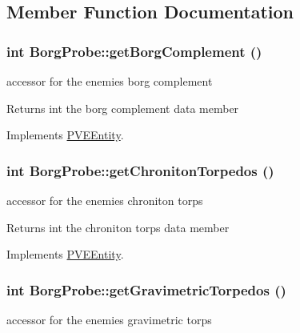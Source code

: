 \subsection{Member Function Documentation}
\hypertarget{classBorgProbe_a4a9d5108f208dcaa28b3f182436fd6e1}{
\subsubsection[{getBorgComplement}]{\setlength{\rightskip}{0pt plus 5cm}int BorgProbe::getBorgComplement ()}}
\label{db/deb/classBorgProbe_a4a9d5108f208dcaa28b3f182436fd6e1}
accessor for the enemies borg complement

\begin{DoxyReturn}{Returns}
int the borg complement data member 
\end{DoxyReturn}


Implements \hyperlink{classPVEEntity}{PVEEntity}.

\hypertarget{classBorgProbe_a4eec0f21a2a68a57498aef50d4d7c544}{
\subsubsection[{getChronitonTorpedos}]{\setlength{\rightskip}{0pt plus 5cm}int BorgProbe::getChronitonTorpedos ()}}
\label{db/deb/classBorgProbe_a4eec0f21a2a68a57498aef50d4d7c544}
accessor for the enemies chroniton torps

\begin{DoxyReturn}{Returns}
int the chroniton torps data member 
\end{DoxyReturn}


Implements \hyperlink{classPVEEntity}{PVEEntity}.

\hypertarget{classBorgProbe_aba5ca1bcf4d4f3f37d80b46bb6b40492}{
\subsubsection[{getGravimetricTorpedos}]{\setlength{\rightskip}{0pt plus 5cm}int BorgProbe::getGravimetricTorpedos ()}}
\label{db/deb/classBorgProbe_aba5ca1bcf4d4f3f37d80b46bb6b40492}
accessor for the enemies gravimetric torps

